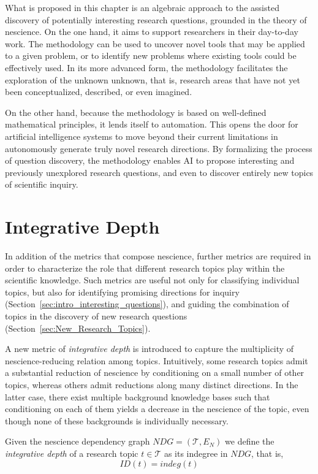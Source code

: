 What is proposed in this chapter is an algebraic approach to the assisted discovery of potentially interesting research questions, grounded in the theory of nescience. On the one hand, it aims to support researchers in their day-to-day work. The methodology can be used to uncover novel tools that may be applied to a given problem, or to identify new problems where existing tools could be effectively used. In its more advanced form, the methodology facilitates the exploration of the unknown unknown, that is, research areas that have not yet been conceptualized, described, or even imagined.

On the other hand, because the methodology is based on well-defined mathematical principles, it lends itself to automation. This opens the door for artificial intelligence systems to move beyond their current limitations in autonomously generate truly novel research directions. By formalizing the process of question discovery, the methodology enables AI to propose interesting and previously unexplored research questions, and even to discover entirely new topics of scientific inquiry.

%
%

\section{Integrative Depth}
\label{sec:integrative_depth}

In addition of the metrics that compose nescience, further metrics are required in order to characterize the role that different research topics play within the scientific knowledge. Such metrics are useful not only for classifying individual topics, but also for identifying promising directions for inquiry (Section~\ref{sec:intro_interesting_questions}), and guiding the combination of topics in the discovery of new research questions (Section~\ref{sec:New_Research_Topics}).

A new metric of \emph{integrative depth} is introduced to capture the multiplicity of nescience-reducing relation among topics. Intuitively, some research topics admit a substantial reduction of nescience by conditioning on a small number of other topics, whereas others admit reductions along many distinct directions. In the latter case, there exist multiple background knowledge bases such that conditioning on each of them yields a decrease in the nescience of the topic, even though none of these backgrounds is individually necessary. 

\begin{definition}
Given the nescience dependency graph $NDG = (\mathcal{T}, E_N)$ we define the \emph{integrative depth} of a research topic $t \in \mathcal{T}$ as its indegree in $NDG$, that is,
\[
ID(t) = indeg(t)
\]
\end{definition}

